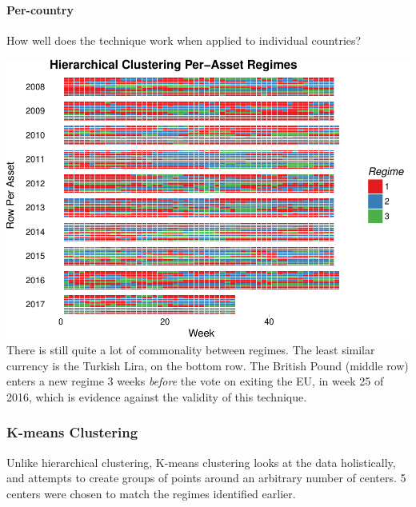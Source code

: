 \documentclass[]{article}
\let\oldparagraph\paragraph
\renewcommand{\paragraph}[1]{\oldparagraph{#1}\mbox{}}
\begin{document}
\paragraph{Per-country}\label{per-country}

How well does the technique work when applied to individual countries?

\includegraphics{Econometric_FX_Forecasting_files/figure-latex/per_asset_hclust-1.pdf}
There is still quite a lot of commonality between regimes. The least
similar currency is the Turkish Lira, on the bottom row. The British
Pound (middle row) enters a new regime 3 weeks \emph{before} the vote on
exiting the EU, in week 25 of 2016, which is evidence against the
validity of this technique.

\subsubsection{K-means Clustering}\label{k-means-clustering}

Unlike hierarchical clustering, K-means clustering looks at the data
holistically, and attempts to create groups of points around an
arbitrary number of centers. 5 centers were chosen to match the regimes
identified earlier.
\end{document}
